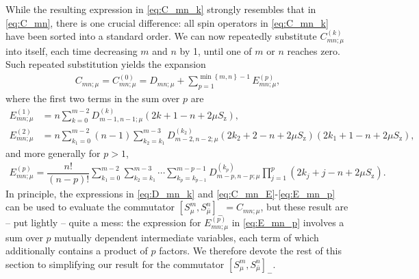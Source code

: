 \documentclass[pra,reprint,longbibliography]{revtex4-1}
\newcommand{\f}[2]{\dfrac{#1}{#2}} %
\newcommand{\p}[1]{\left(#1\right)} %
\renewcommand{\sp}[1]{\left[#1\right]} %
\renewcommand{\set}[1]{\left\{#1\right\}} %
\newcommand{\z}{\text{z}}
\newcommand{\bmu}{{\bar\mu}}
\newcommand{\1}{\mathds{1}}
\begin{document}
While the resulting expression in \eqref{eq:C_mn_k} strongly resembles
that in \eqref{eq:C_mn}, there is one crucial difference: all spin
operators in \eqref{eq:C_mn_k} have been sorted into a standard order.
We can now repeatedly substitute $C_{mn;\mu}^{(k)}$ into itself, each
time decreasing $m$ and $n$ by 1, until one of $m$ or $n$ reaches
zero.  Such repeated substitution yields the expansion
\begin{align}
  C_{mn;\mu}
  = C_{mn;\mu}^{(0)}
  = D_{mn;\mu}
  + \sum_{p=1}^{\min\set{m,n}-1} E_{mn;\mu}^{(p)},
  \label{eq:C_mn_E}
\end{align}
where the first two terms in the sum over $p$ are
\begin{align}
  E_{mn;\mu}^{(1)}
  &= n \sum_{k=0}^{m-2} D_{m-1,n-1;\mu}^{(k)} \p{2k+1-n+2\mu S_\z}, \\
  E_{mn;\mu}^{(2)}
  &= n \sum_{k_1=0}^{m-2} \p{n-1} \sum_{k_2=k_1}^{m-3}
  D_{m-2,n-2;\mu}^{(k_2)} \p{2k_2+2-n+2\mu S_\z} \p{2k_1+1-n+2\mu S_\z},
\end{align}
and more generally for $p>1$,
\begin{align}
  E_{mn;\mu}^{(p)}
  = \f{n!}{\p{n-p}!}
  \sum_{k_1=0}^{m-2} \sum_{k_2=k_1}^{m-3} \cdots\sum_{k_p=k_{p-1}}^{m-p-1}
  D_{m-p,n-p;\mu}^{(k_p)} \prod_{j=1}^p \p{2k_j+j-n+2\mu S_\z}.
  \label{eq:E_mn_p}
\end{align}
In principle, the expressions in \eqref{eq:D_mn_k} and
\eqref{eq:C_mn_E}-\eqref{eq:E_mn_p} can be used to evaluate the
commutator $\sp{S_\mu^m,S_\bmu^n}_- = C_{mn;\mu}$, but these result
are -- put lightly -- quite a mess: the expression for
$E_{mn;\mu}^{(p)}$ in \eqref{eq:E_mn_p} involves a sum over $p$
mutually dependent intermediate variables, each term of which
additionally contains a product of $p$ factors.  We therefore devote
the rest of this section to simplifying our result for the commutator
$\sp{S_\mu^m,S_\bmu^n}_-$.
\end{document}
